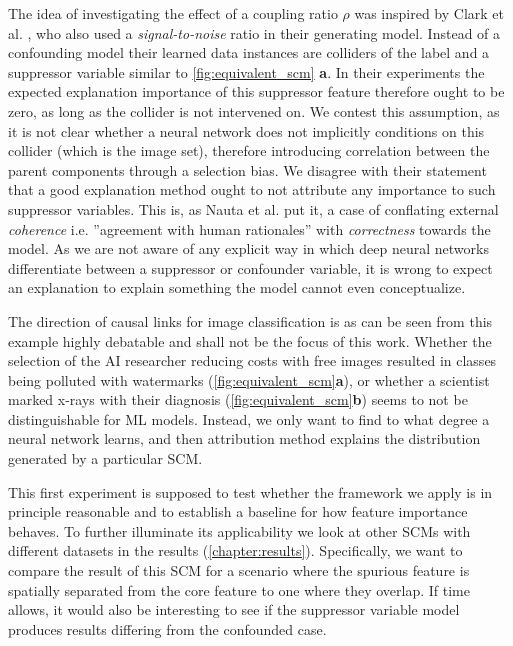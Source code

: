 The idea of investigating the effect of a coupling ratio $\rho$ was inspired by Clark et al. \cite{Clark2023}, who also used a \textit{signal-to-noise} ratio in their generating model. Instead of a confounding model their learned data instances are colliders of the label and a suppressor variable similar to \cref{fig:equivalent_scm} \textbf{a}. In their experiments the expected explanation importance of this suppressor feature therefore ought to be zero, as long as the collider is not intervened on. We contest this assumption, as it is not clear whether a neural network does not implicitly conditions on this collider (which is the image set), therefore introducing correlation between the parent components through a selection bias. We disagree with their statement that a good explanation method ought to not attribute any importance to such suppressor variables. This is, as Nauta et al. \cite{Nauta2023} put it, a case of conflating external \textit{coherence} i.e. ''agreement with human rationales'' \cite{Atanasova2020} with \textit{correctness} towards the model. As we are not aware of any explicit way in which deep neural networks differentiate between a suppressor or confounder variable, it is wrong to expect an explanation to explain something the model cannot even conceptualize. 

The direction of causal links for image classification is as can be seen from this example highly debatable and shall not be the focus of this work. Whether the selection of the AI researcher reducing costs with free images resulted in classes being polluted with watermarks (\cref{fig:equivalent_scm}\textbf{a}), or whether a scientist marked x-rays with their diagnosis (\cref{fig:equivalent_scm}\textbf{b}) seems to not be distinguishable for ML models. 
Instead, we only want to find to what degree a neural network learns, and then attribution method explains the distribution generated by a particular SCM.

This first experiment is supposed to test whether the framework we apply is in principle reasonable and to establish a baseline for how feature importance behaves. To further illuminate its applicability we look at other SCMs with different datasets in the results (\cref{chapter:results}). Specifically, we want to compare the result of this SCM for a scenario where the spurious feature is spatially separated from the core feature to one where they overlap. 
If time allows, it would also be interesting to see if the suppressor variable model produces results differing from the confounded case.

